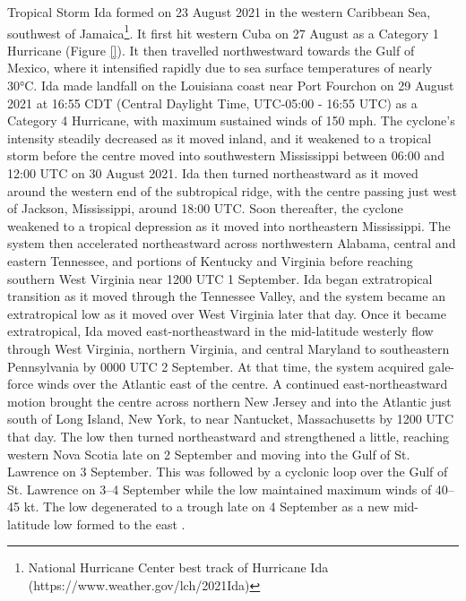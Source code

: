 Tropical  Storm Ida formed on 23 August 2021 in the western Caribbean Sea, southwest of Jamaica\footnote{National Hurricane Center best track of Hurricane Ida (https://www.weather.gov/lch/2021Ida)}. It first hit western Cuba on 27 August as a Category 1 Hurricane (Figure \ref{}). It then travelled northwestward towards the Gulf of Mexico, where it intensified rapidly due to sea surface temperatures of nearly 30°C. Ida made landfall on the Louisiana coast near Port Fourchon on 29 August 2021 at 16:55 CDT (Central Daylight Time, UTC-05:00 - 16:55 UTC) as a Category 4 Hurricane, with maximum sustained winds of 150 mph. The cyclone’s intensity steadily decreased as it moved inland, and it weakened to a tropical storm before the centre moved into southwestern Mississippi between 06:00 and 12:00 UTC on 30 August 2021. Ida then turned northeastward as it moved around the western end of the subtropical ridge, with the centre passing just west of Jackson, Mississippi, around 18:00 UTC. Soon thereafter, the cyclone weakened to a tropical depression as it moved into northeastern Mississippi. The system then accelerated northeastward across northwestern Alabama, central and eastern Tennessee, and portions of Kentucky and Virginia before reaching southern West Virginia near 1200 UTC 1 September. Ida began extratropical transition as it moved through the Tennessee Valley, and the system became an extratropical low as it moved over West Virginia later that day. Once it became extratropical, Ida moved east-northeastward in the mid-latitude westerly flow through West Virginia, northern Virginia, and central Maryland to southeastern Pennsylvania by 0000 UTC 2 September. At that time, the system acquired gale-force winds over the Atlantic east of the centre. A continued east-northeastward motion brought the centre across northern New Jersey and into the Atlantic just south of Long Island, New York, to near Nantucket, Massachusetts by 1200 UTC that day. The low then turned northeastward and strengthened a little, reaching western Nova Scotia late on 2 September and moving into the Gulf of St. Lawrence on 3 September. This was followed by a cyclonic loop over the Gulf of St. Lawrence on 3–4 September while the low maintained maximum winds of 40–45 kt. The low degenerated to a trough late on 4 September as a new mid-latitude low formed to the east \citep{Beven_2022}.

